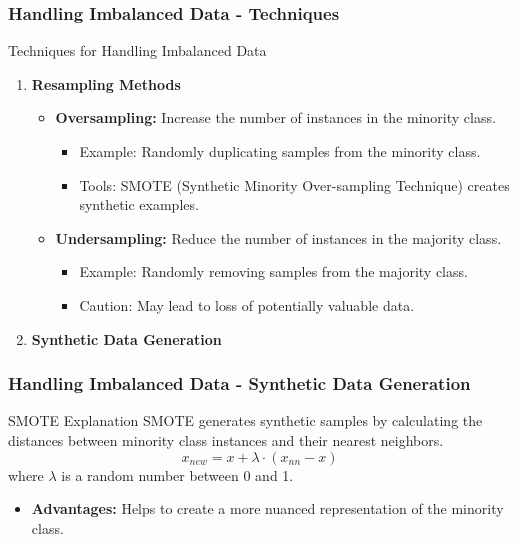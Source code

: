 \documentclass[aspectratio=169]{beamer}
\begin{document}
\begin{frame}[fragile]
    \frametitle{Handling Imbalanced Data - Techniques}
    \begin{block}{Techniques for Handling Imbalanced Data}
        \begin{enumerate}
            \item \textbf{Resampling Methods}
            \begin{itemize}
                \item \textbf{Oversampling:} Increase the number of instances in the minority class.
                    \begin{itemize}
                        \item Example: Randomly duplicating samples from the minority class.
                        \item Tools: SMOTE (Synthetic Minority Over-sampling Technique) creates synthetic examples.
                    \end{itemize}
                \item \textbf{Undersampling:} Reduce the number of instances in the majority class.
                    \begin{itemize}
                        \item Example: Randomly removing samples from the majority class.
                        \item Caution: May lead to loss of potentially valuable data.
                    \end{itemize}
            \end{itemize}
            \item \textbf{Synthetic Data Generation}
        \end{enumerate}
    \end{block}
\end{frame}

\begin{frame}[fragile]
    \frametitle{Handling Imbalanced Data - Synthetic Data Generation}
    \begin{block}{SMOTE Explanation}
        SMOTE generates synthetic samples by calculating the distances between minority class instances and their nearest neighbors.
        \begin{equation}
            x_{new} = x + \lambda \cdot (x_{nn} - x)
        \end{equation}
        where $\lambda$ is a random number between 0 and 1.
    \end{block}
    \begin{itemize}
        \item \textbf{Advantages:} Helps to create a more nuanced representation of the minority class.
    \end{itemize}
\end{frame}
\end{document}
